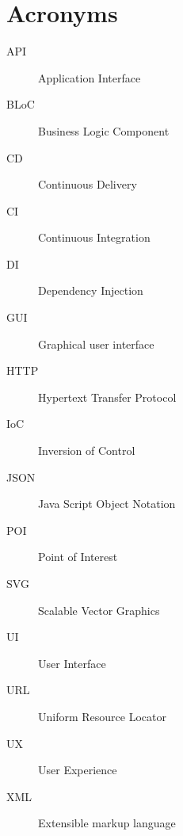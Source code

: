\chapter{Acronyms}\label{ch:acronyms}
\begin{description}
	\item[API] Application Interface
	\item[BLoC] Business Logic Component
	\item[CD] Continuous Delivery
	\item[CI] Continuous Integration
	\item[DI] Dependency Injection
	\item[GUI] Graphical user interface
	\item[HTTP] Hypertext Transfer Protocol
	\item[IoC] Inversion of Control
	\item[JSON] Java Script Object Notation
	\item[POI] Point of Interest
	\item[SVG] Scalable Vector Graphics
	\item[UI] User Interface
	\item[URL] Uniform Resource Locator
	\item[UX] User Experience
	\item[XML] Extensible markup language
\end{description}
